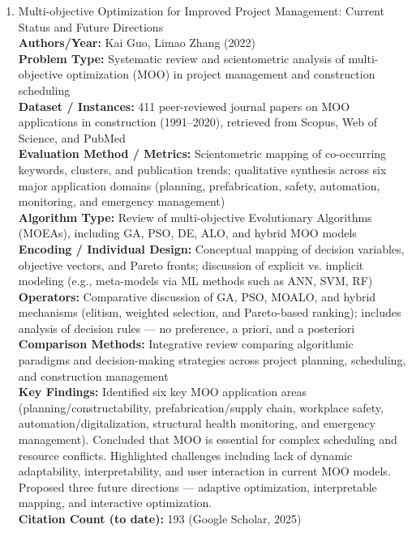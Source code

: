 \documentclass[a4paper,12pt]{article}
\begin{document}
\begin{enumerate}[leftmargin=2em, labelwidth=1em, labelsep=0.5em, itemsep=1ex]
  \item Multi-objective Optimization for Improved Project Management: Current Status and Future Directions \\
    \textbf{Authors/Year:} Kai Guo, Limao Zhang (2022) \\  
    \textbf{Problem Type:} Systematic review and scientometric analysis of multi-objective optimization (MOO) in project management and construction scheduling \\  
    \textbf{Dataset / Instances:} 411 peer-reviewed journal papers on MOO applications in construction (1991–2020), retrieved from Scopus, Web of Science, and PubMed \\  
    \textbf{Evaluation Method / Metrics:} Scientometric mapping of co-occurring keywords, clusters, and publication trends; qualitative synthesis across six major application domains (planning, prefabrication, safety, automation, monitoring, and emergency management) \\  
    \textbf{Algorithm Type:} Review of multi-objective Evolutionary Algorithms (MOEAs), including GA, PSO, DE, ALO, and hybrid MOO models \\  
    \textbf{Encoding / Individual Design:} Conceptual mapping of decision variables, objective vectors, and Pareto fronts; discussion of explicit vs. implicit modeling (e.g., meta-models via ML methods such as ANN, SVM, RF) \\  
    \textbf{Operators:} Comparative discussion of GA, PSO, MOALO, and hybrid mechanisms (elitism, weighted selection, and Pareto-based ranking); includes analysis of decision rules — no preference, a priori, and a posteriori \\  
    \textbf{Comparison Methods:} Integrative review comparing algorithmic paradigms and decision-making strategies across project planning, scheduling, and construction management \\  
    \textbf{Key Findings:} Identified six key MOO application areas (planning/constructability, prefabrication/supply chain, workplace safety, automation/digitalization, structural health monitoring, and emergency management). Concluded that MOO is essential for complex scheduling and resource conflicts. Highlighted challenges including lack of dynamic adaptability, interpretability, and user interaction in current MOO models. Proposed three future directions — adaptive optimization, interpretable mapping, and interactive optimization. \\  
    \textbf{Citation Count (to date):} 193 (Google Scholar, 2025) \\[2ex]





\end{enumerate}
\end{document}
